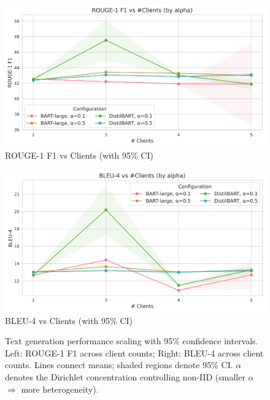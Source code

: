 \documentclass[conference]{IEEEtran}
\begin{document}
\begin{figure}[H]
    \centering
    \begin{minipage}[t]{0.48\textwidth}
        \centering
        \includegraphics[width=\linewidth]{../plots/generation/rouge1_vs_clients_combined.png}\\[-2pt]
        {\footnotesize ROUGE-1 F1 vs Clients (with 95\% CI)}
    \end{minipage}\hfill
    \begin{minipage}[t]{0.48\textwidth}
        \centering
        \includegraphics[width=\linewidth]{../plots/generation/bleu4_vs_clients_combined.png}\\[-2pt]
        {\footnotesize BLEU-4 vs Clients (with 95\% CI)}
    \end{minipage}
    \caption{Text generation performance scaling with 95\% confidence intervals. Left: ROUGE-1 F1 across client counts; Right: BLEU-4 across client counts. Lines connect means; shaded regions denote 95\% CI. $\alpha$ denotes the Dirichlet concentration controlling non-IID (smaller $\alpha$ $\Rightarrow$ more heterogeneity).}
    \label{fig:model_comparison_textgen}
\end{figure}
\end{document}
